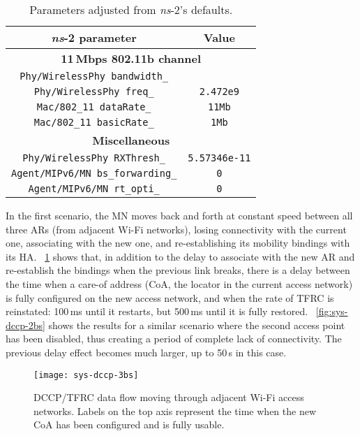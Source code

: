 \documentclass[twocolumn]{nictatechreport}
\newcommand{\ns}{\textit{ns}}
\begin{document}
\begin{table}[tb]
  \centering

  \caption[Simulations parameters adjusted from \ns-2's defaults]{Parameters
  adjusted from \ns-2's defaults.}

  \label{tab:ns80211}
  \begin{tabular}{cc}
    \toprule
    \textbf{\ns-2 parameter} & \textbf{Value} \\
    \midrule
    \multicolumn{2}{c}{\textbf{11\,Mbps 802.11b channel}} \\
    \midrule
    \verb#Phy/WirelessPhy bandwidth_# & \verb#11Mb# \\
    \verb#Phy/WirelessPhy freq_# & \verb_2.472e9_ \\
    \verb#Mac/802_11 dataRate_# & \verb_11Mb_ \\
    \verb#Mac/802_11 basicRate_# & \verb_1Mb_ \\
    \midrule
    \multicolumn{2}{c}{\textbf{Miscellaneous}} \\
    \midrule
    \verb#Phy/WirelessPhy RXThresh_# & \verb_5.57346e-11_ \\
    \verb#Agent/MIPv6/MN bs_forwarding_# & \verb_0_ \\
    \verb#Agent/MIPv6/MN rt_opti_# & \verb_0_ \\
    \bottomrule
  \end{tabular}
\end{table}

In the first scenario, the MN moves back and forth at constant speed between all
three ARs (from adjacent Wi-Fi networks), losing connectivity with the current
one, associating with the new one, and re-establishing its mobility bindings
with its HA. \figurename~\ref{fig:sys-dccp-3bs} shows that, in addition to the
delay to associate with the new AR and re-establish the bindings when the
previous link breaks, there is a delay between the time when a care-of address
(CoA, the locator in the current access network) is fully configured on the new
access network, and when the rate of TFRC is reinstated: 100\,ms until it
restarts, but 500\,ms until it is fully restored.
\figurename~\ref{fig:sys-dccp-2bs} shows the results for a similar scenario
where the second access point has been disabled, thus creating a period of
complete lack of connectivity.  The previous delay effect becomes much larger,
up to 50\,s in this case.

\begin{figure}[tb]
  \centering
  \texttt{[image: sys-dccp-3bs]}

  \caption[DCCP/TFRC data flow moving through adjacent Wi-Fi access
  networks]{DCCP/TFRC data flow moving through adjacent Wi-Fi access
  networks. Labels on the top axis represent the time when the new CoA has
  been configured and is fully usable.}
  
  \label{fig:sys-dccp-3bs}

\end{figure}
\end{document}
